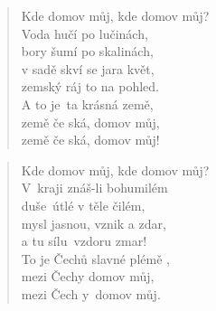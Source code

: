 \begin{song}{}
\begin{verse}
   Kde domov můj, kde domov můj? \\
   Voda hučí po lučinách, \\
   bory šumí po skalinách, \\
   v sadě skví se jara květ, \\
   zemský ráj to na pohled. \\
   A to je~ta krásná země,   \\
   země če ská, domov můj,   \\
   země če ská, domov můj!
\end{verse}
\begin{verse}
   Kde domov můj, kde domov můj? \\
   V~kraji znáš-li bohumilém \\
   duše~útlé v těle čilém, \\
   mysl jasnou, vznik a zdar, \\
   a tu sílu~vzdoru zmar! \\
   To je Čechů slavné plémě , \\
   mezi Čechy domov můj, \\
   mezi Čech y~domov můj. ~~~   ~~~          
\end{verse}
\end{song}
\pagebreak
